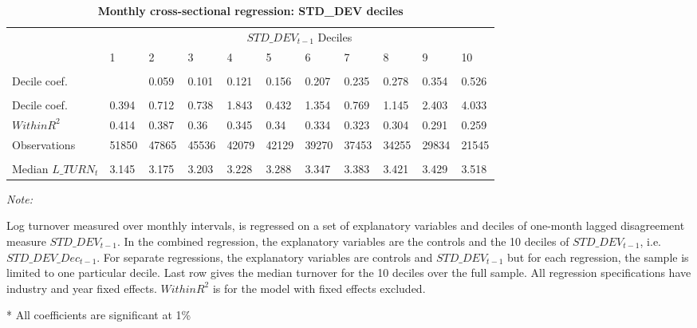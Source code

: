 \begin{table}

\caption{\label{tab:reg_std_dev_deciles}\textbf{Monthly cross-sectional regression: STD\_DEV deciles}}
\centering
\fontsize{10}{12}\selectfont
\begin{threeparttable}
\begin{tabular}[t]{lllllllllll}
\toprule
\multicolumn{1}{c}{ } & \multicolumn{10}{c}{$STD\_DEV_{t-1}$ Deciles} \\
\cmidrule(l{3pt}r{3pt}){2-11}
 & 1 & 2 & 3 & 4 & 5 & 6 & 7 & 8 & 9 & 10\\
\midrule
\addlinespace[0.3em]
\multicolumn{11}{l}{\textbf{Combined Regression}}\\
\hspace{1em}Decile coef. &  & 0.059 & 0.101 & 0.121 & 0.156 & 0.207 & 0.235 & 0.278 & 0.354 & 0.526\\
\addlinespace[0.3em]
\multicolumn{11}{l}{\textbf{Separate Regressions}}\\
\hspace{1em}Decile coef. & 0.394 & 0.712 & 0.738 & 1.843 & 0.432 & 1.354 & 0.769 & 1.145 & 2.403 & 4.033\\
\hspace{1em}$Within R^2$ & 0.414 & 0.387 & 0.36 & 0.345 & 0.34 & 0.334 & 0.323 & 0.304 & 0.291 & 0.259\\
\hspace{1em}Observations & 51850 & 47865 & 45536 & 42079 & 42129 & 39270 & 37453 & 34255 & 29834 & 21545\\
\addlinespace[0.3em]
\multicolumn{11}{l}{\textbf{Overall Sample}}\\
\hspace{1em}Median $L\_TURN_t$ & 3.145 & 3.175 & 3.203 & 3.228 & 3.288 & 3.347 & 3.383 & 3.421 & 3.429 & 3.518\\
\bottomrule
\end{tabular}
\begin{tablenotes}
\item \textit{Note: } 
\item Log turnover measured over monthly intervals, is regressed on a set of explanatory variables and deciles of one-month lagged disagreement measure $STD\_DEV_{t-1}$. In the combined regression, the explanatory variables are the controls and the 10 deciles of $STD\_DEV_{t-1}$, i.e. $STD\_DEV\_Dec_{t-1}$. For separate regressions, the explanatory variables are controls and $STD\_DEV_{t-1}$ but for each regression, the sample is limited to one particular decile. Last row gives the median turnover for the 10 deciles over the full sample. All regression specifications have industry and year fixed effects. $Within R^2$ is for the model with fixed effects excluded.
\item[*] All coefficients are significant at 1\%
\end{tablenotes}
\end{threeparttable}
\end{table}